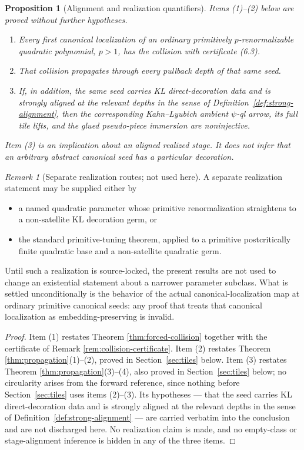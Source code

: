 \documentclass[11pt,reqno]{amsart}
\newtheorem{proposition}[theorem]{Proposition}
\theoremstyle{definition}
\theoremstyle{remark}
\newtheorem{remark}[theorem]{Remark}
\begin{document}
\begin{proposition}[Alignment and realization quantifiers]\label{prop:realization}
Items (1)--(2) below are proved without further hypotheses.
\begin{enumerate}
\item Every first canonical localization of an ordinary primitively \(p\)-renormalizable quadratic polynomial, \(p>1\), has the collision with certificate (6.3).
\item That collision propagates through every pullback depth of that same seed.
\item If, in addition, the same seed carries KL direct-decoration data and is strongly aligned at the relevant depths in the sense of Definition~\ref{def:strong-alignment}, then the corresponding Kahn--Lyubich ambient \(\psi\)-ql arrow, its full tile lifts, and the glued pseudo-piece immersion are noninjective.
\end{enumerate}
Item (3) is an implication about an aligned realized stage.  It does not infer that an arbitrary abstract canonical seed has a particular decoration.
\end{proposition}

\begin{remark}[Separate realization routes; not used here]\label{rem:realization-routes}
A separate realization statement may be supplied either by
\begin{itemize}
\item a named quadratic parameter whose primitive renormalization straightens to a non-satellite KL decoration germ, or
\item the standard primitive-tuning theorem, applied to a primitive postcritically finite quadratic base and a non-satellite quadratic germ.
\end{itemize}
Until such a realization is source-locked, the present results are not used to change an existential statement about a narrower parameter subclass.  What is settled unconditionally is the behavior of the actual canonical-localization map at ordinary primitive canonical seeds: any proof that treats that canonical localization as embedding-preserving is invalid.
\end{remark}

\begin{proof}
Item (1) restates Theorem \ref{thm:forced-collision} together with the certificate of Remark \ref{rem:collision-certificate}.  Item (2) restates Theorem \ref{thm:propagation}(1)--(2), proved in Section~\ref{sec:tiles} below.  Item (3) restates Theorem \ref{thm:propagation}(3)--(4), also proved in Section~\ref{sec:tiles} below; no circularity arises from the forward reference, since nothing before Section~\ref{sec:tiles} uses items (2)--(3).  Its hypotheses --- that the seed carries KL direct-decoration data and is strongly aligned at the relevant depths in the sense of Definition~\ref{def:strong-alignment} --- are carried verbatim into the conclusion and are not discharged here.  No realization claim is made, and no empty-class or stage-alignment inference is hidden in any of the three items.
\end{proof}
\end{document}
